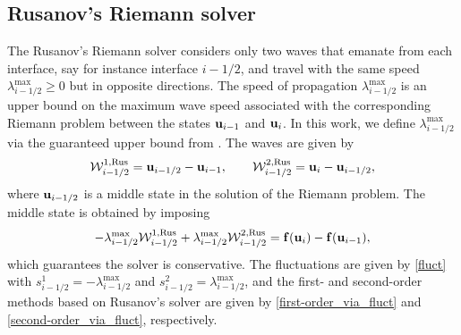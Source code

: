\documentclass[preprint, 11pt]{article}
\newcommand{\W}{{\mathcal W}}
\newcommand{\bff}{{\bf f}}
\newcommand{\bfu}{{\bf u}}
\newcommand{\Rus}{{\rm Rus}}
\begin{document}
\subsection{Rusanov's Riemann solver}\label{sec:rusanov}
The Rusanov's Riemann solver considers only two waves that emanate from each interface, 
say for instance interface $i-1/2$, and travel with the same speed $\lambda_{i-1/2}^{\max}\geq 0$ 
but in opposite directions. 
The speed of propagation $\lambda_{i-1/2}^{\max}$ is an upper bound on the maximum wave speed
associated with the corresponding Riemann problem between the states $\bfu_{i-1}$ and $\bfu_{i}$. 
In this work, we define $\lambda_{i-1/2}^{\max}$ via the guaranteed upper bound from \cite[Prop. 3.7]{azerad2017well}. 
The waves are given by 
\begin{align}\label{rusanov_waves}
  \W_{i-1/2}^{1,\Rus}=\bfu_{i-1/2}-\bfu_{i-1}, \qquad 
  \W_{i-1/2}^{2,\Rus}=\bfu_{i}-\bfu_{i-1/2}, 
\end{align}
where $\bfu_{i-1/2}$ is a middle state in the solution of the Riemann problem. The middle state is obtained
by imposing
\begin{align}\label{rus_cons}
  -\lambda_{i-1/2}^{\max}\W_{i-1/2}^{1,\Rus}+\lambda_{i-1/2}^{\max}\W_{i-1/2}^{2,\Rus} = \bff(\bfu_{i})-\bff(\bfu_{i-1}),
\end{align}
which guarantees the solver is conservative. 
The fluctuations are given by \eqref{fluct} with $s_{i-1/2}^1=-\lambda_{i-1/2}^{\max}$
and $s_{i-1/2}^2=\lambda_{i-1/2}^{\max}$, and the first- and second-order methods based 
on Rusanov's solver are given by \eqref{first-order_via_fluct} and \eqref{second-order_via_fluct}, respectively.
\end{document}
